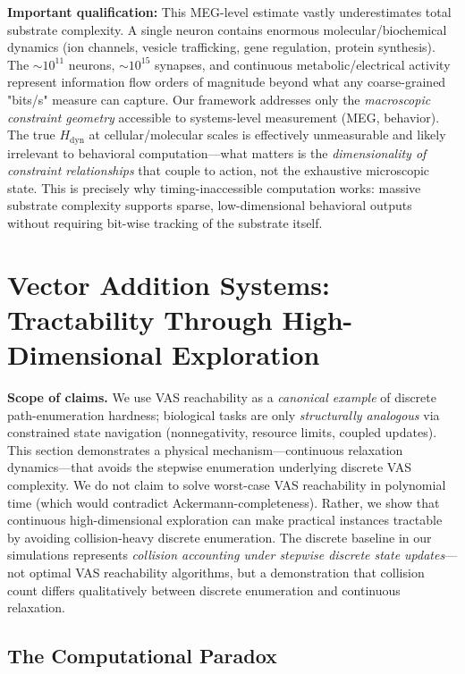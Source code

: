 \documentclass[12pt]{article}
\begin{document}
\textbf{Important qualification:} This MEG-level estimate vastly underestimates total substrate complexity. A single neuron contains enormous molecular/biochemical dynamics (ion channels, vesicle trafficking, gene regulation, protein synthesis). The ${\sim}10^{11}$ neurons, ${\sim}10^{15}$ synapses, and continuous metabolic/electrical activity represent information flow orders of magnitude beyond what any coarse-grained "bits/s" measure can capture. Our framework addresses only the \textit{macroscopic constraint geometry} accessible to systems-level measurement (MEG, behavior). The true $H_{\text{dyn}}$ at cellular/molecular scales is effectively unmeasurable and likely irrelevant to behavioral computation—what matters is the \textit{dimensionality of constraint relationships} that couple to action, not the exhaustive microscopic state. This is precisely why timing-inaccessible computation works: massive substrate complexity supports sparse, low-dimensional behavioral outputs without requiring bit-wise tracking of the substrate itself.

\section{Vector Addition Systems: Tractability Through High-Dimensional Exploration}
\label{sec:vas}

\textbf{Scope of claims.} We use VAS reachability as a \textit{canonical example} of discrete path-enumeration hardness; biological tasks are only \textit{structurally analogous} via constrained state navigation (nonnegativity, resource limits, coupled updates). This section demonstrates a physical mechanism---continuous relaxation dynamics---that avoids the stepwise enumeration underlying discrete VAS complexity. We do not claim to solve worst-case VAS reachability in polynomial time (which would contradict Ackermann-completeness). Rather, we show that continuous high-dimensional exploration can make practical instances tractable by avoiding collision-heavy discrete enumeration. The discrete baseline in our simulations represents \textit{collision accounting under stepwise discrete state updates}---not optimal VAS reachability algorithms, but a demonstration that collision count differs qualitatively between discrete enumeration and continuous relaxation.

\subsection{The Computational Paradox}
\end{document}
